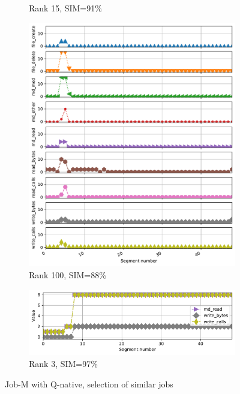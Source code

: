 \documentclass{jhps}
\begin{document}
\begin{figure}[bt]
\begin{subfigure}{0.3\textwidth}
\caption{Rank 15, SIM=91\%}
\end{subfigure}
\begin{subfigure}{0.3\textwidth}
\centering
\includegraphics[width=\textwidth]{job_similarities_5024292-out/hex_native-0.8838--99timeseries7571967}
\caption{Rank 100, SIM=88\%}
\end{subfigure}

\begin{subfigure}{0.3\textwidth}

\vspace*{-1.5cm}
\centering
\includegraphics[width=\textwidth]{job_similarities_5024292-out/hex_native-0.9651--2timeseries7826634}
\caption{Rank 3, SIM=97\%}
\end{subfigure}

\caption{Job-M with Q-native, selection of similar jobs}%
\label{fig:job-M-hex-native}
\end{figure}
\end{document}
